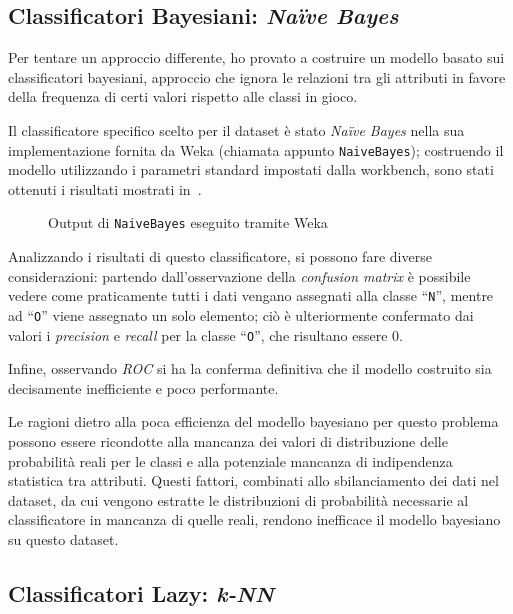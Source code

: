 \subsection{Classificatori Bayesiani: \emph{Naïve Bayes}}

Per tentare un approccio differente, ho provato a costruire un modello basato sui classificatori bayesiani,
approccio che ignora le relazioni tra gli attributi in favore della frequenza di certi valori rispetto alle classi in gioco.

Il classificatore specifico scelto per il dataset è stato \emph{Naïve Bayes} nella sua implementazione fornita da Weka (chiamata appunto \texttt{NaiveBayes});
costruendo il modello utilizzando i parametri standard impostati dalla workbench, sono stati ottenuti i risultati mostrati in~.

\begin{figure}[H]
  \centering
  \caption{Output di \texttt{NaiveBayes} eseguito tramite Weka}%
  \label{fig:bayes}
\end{figure}

Analizzando i risultati di questo classificatore, si possono fare diverse considerazioni:
partendo dall'osservazione della \emph{confusion matrix} è possibile vedere come praticamente tutti i dati vengano assegnati alla classe ``\texttt{N}'', mentre ad ``\texttt{O}'' viene assegnato un solo elemento;
ciò è ulteriormente confermato dai valori i \emph{precision} e \emph{recall} per la classe ``\texttt{O}'', che risultano essere \(0\).

Infine, osservando \emph{ROC} si ha la conferma definitiva che il modello costruito sia decisamente inefficiente e poco performante.

Le ragioni dietro alla poca efficienza del modello bayesiano per questo problema possono essere ricondotte alla mancanza dei valori di distribuzione delle probabilità reali per le classi e alla potenziale mancanza di indipendenza statistica tra attributi.
Questi fattori, combinati allo sbilanciamento dei dati nel dataset, da cui vengono estratte le distribuzioni di probabilità necessarie al classificatore in mancanza di quelle reali, rendono inefficace il modello bayesiano su questo dataset.

\subsection{Classificatori Lazy: \emph{k-NN}}

